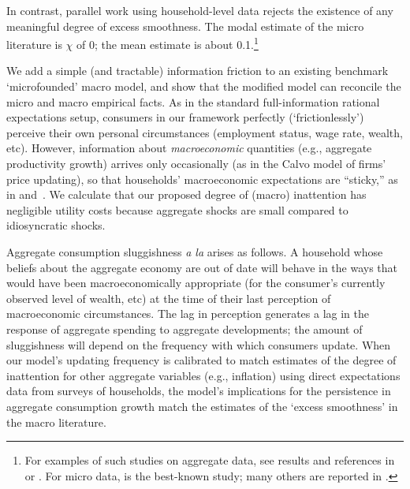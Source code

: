 In contrast, parallel work using household-level data rejects the existence of any meaningful degree of excess smoothness.  The modal estimate of the micro literature is $\chi$ of 0; the mean estimate is about 0.1.\footnote{For examples of such studies on aggregate data, see results and references in \cite{fuhrer:habits} or \cite{cee:habits}. For micro data, \cite{dynanHabits} is the best-known study; many others are reported in \cite{hrsHabit}.}


We add a simple (and tractable) information friction to an existing benchmark `microfounded' macro model, and show that the modified model can reconcile the micro and macro empirical facts. As in the standard full-information rational expectations setup, consumers in our framework perfectly (`frictionlessly') perceive their own personal circumstances (employment status, wage rate, wealth, etc). However, information about \textit{macroeconomic} quantities (e.g., aggregate productivity growth) arrives only occasionally (as in the Calvo model of firms' price updating), so that households' macroeconomic expectations are ``sticky,'' as in \cite{mrSlumps} and~\cite{carroll:epidemicinflQJE}. We calculate that our proposed degree of (macro) inattention has negligible utility costs because aggregate shocks are small compared to idiosyncratic shocks.

Aggregate consumption sluggishness \textit{a la} \cite{cdSmooth} arises as follows.  A household whose beliefs about the aggregate economy are out of date will behave in the ways that would have been macroeconomically appropriate (for the consumer's currently observed level of wealth, etc) at the time of their last perception of macroeconomic circumstances.  The lag in perception generates a lag in the response of aggregate spending to aggregate developments; the amount of sluggishness will depend on the frequency with which consumers update.  When our model's updating frequency is calibrated to match estimates of the degree of inattention for other aggregate variables (e.g., inflation) using direct expectations data from surveys of households, the model's implications for the persistence in aggregate consumption growth match the estimates of the `excess smoothness' in the macro literature. %

